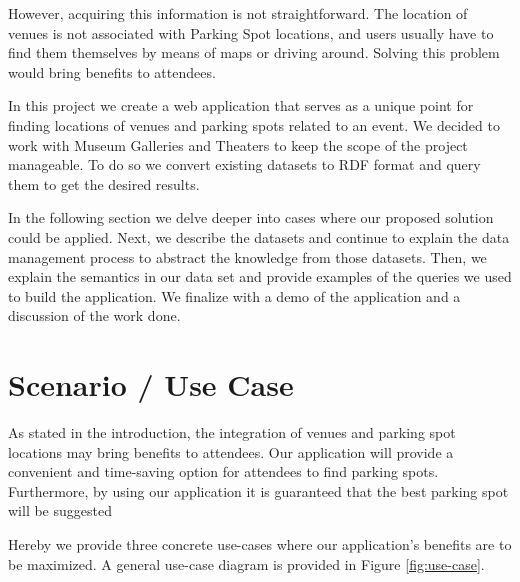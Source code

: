 \documentclass[runningheads,a4paper]{../../StyleFiles/llncs}
\begin{document}
However, acquiring this information is not straightforward. The location of venues is not associated with Parking Spot locations, and users usually have to find them themselves by means of maps or driving around. Solving this problem would bring benefits to attendees. %

In this project we create a web application that serves as a unique point for finding locations of venues and parking spots related to an event. We decided to work with Museum Galleries and Theaters to keep the scope of the project manageable. To do so we convert existing datasets to RDF format and query them to get the desired results.

In the following section we delve deeper into cases where our proposed solution could be applied. Next, we describe the datasets and continue to explain the data management process to abstract the knowledge from those datasets. Then, we explain the semantics in our data set and provide examples of the queries we used to build the application. We finalize with a demo of the application and a discussion of the work done.  

\section{Scenario / Use Case}

As stated in the introduction, the integration of venues and parking spot locations may bring benefits to attendees. Our application will provide a convenient and time-saving option for attendees to find parking spots. Furthermore, by using our application it is guaranteed that the best parking spot will be suggested %

Hereby we provide three concrete use-cases where our application's benefits are to be maximized. A general use-case diagram is provided in Figure \ref{fig:use-case}.
\end{document}
